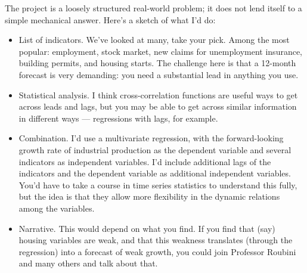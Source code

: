 \documentclass[letterpaper,12pt]{article}
\begin{document}
\newpage
{The project is a loosely structured real-world problem;
it does not lend itself to a simple mechanical answer.
Here's a sketch of what I'd do: }  
\begin{itemize}
\item List of indicators.  
We've looked at many, take your pick.  
Among the most popular:  
employment, stock market, new claims for unemployment insurance, 
building permits, and housing starts.
The challenge here is that a 12-month forecast is very demanding:
you need a substantial lead in anything you use.  

\item Statistical analysis.  
I think cross-correlation functions are useful ways to get across leads and lags, but you may be able to get across similar 
information in different ways --- regressions with lags, for example.  

\item Combination.  
I'd use a multivariate regression, with the forward-looking growth 
rate of industrial production as the dependent variable
and several indicators as independent variables.
I'd include additional lags of the indicators and the dependent 
variable as additional independent variables.
You'd have to take a course in time series statistics 
to understand this fully, 
but the idea is that they allow more flexibility in the dynamic relations
among the variables.  

\item Narrative.  This would depend on what you find.
If you find that (say) housing variables are weak,
and that this weakness translates (through the regression)
into a forecast of weak growth, 
you could join Professor Roubini and many others and talk about that.

\end{itemize}
\end{document}
